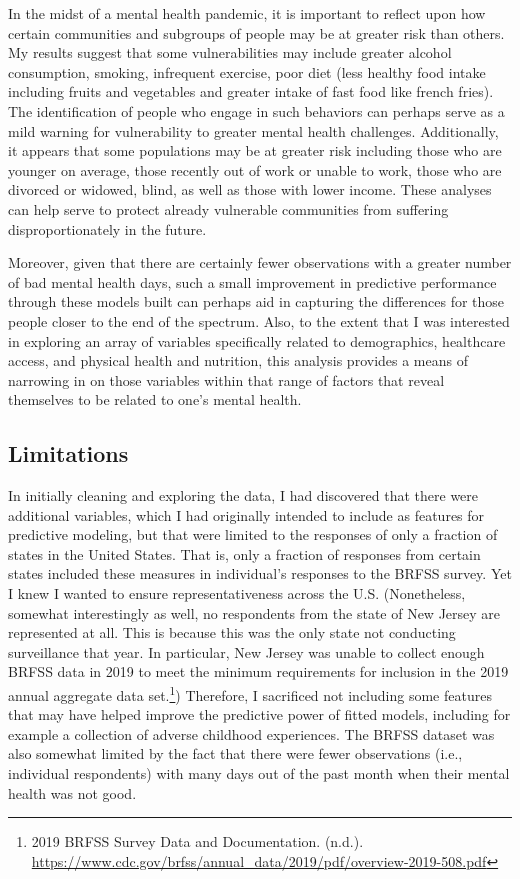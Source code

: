\documentclass[
]{article}
\begin{document}
In the midst of a mental health pandemic, it is important to reflect upon how certain communities and subgroups of people may be at greater risk than others. My results suggest that some vulnerabilities may include greater alcohol consumption, smoking, infrequent exercise, poor diet (less healthy food intake including fruits and vegetables and greater intake of fast food like french fries). The identification of people who engage in such behaviors can perhaps serve as a mild warning for vulnerability to greater mental health challenges. Additionally, it appears that some populations may be at greater risk including those who are younger on average, those recently out of work or unable to work, those who are divorced or widowed, blind, as well as those with lower income. These analyses can help serve to protect already vulnerable communities from suffering disproportionately in the future.

Moreover, given that there are certainly fewer observations with a greater number of bad mental health days, such a small improvement in predictive performance through these models built can perhaps aid in capturing the differences for those people closer to the end of the spectrum. Also, to the extent that I was interested in exploring an array of variables specifically related to demographics, healthcare access, and physical health and nutrition, this analysis provides a means of narrowing in on those variables within that range of factors that reveal themselves to be related to one's mental health.

\hypertarget{limitations}{%
\subsection{Limitations}\label{limitations}}

In initially cleaning and exploring the data, I had discovered that there were additional variables, which I had originally intended to include as features for predictive modeling, but that were limited to the responses of only a fraction of states in the United States. That is, only a fraction of responses from certain states included these measures in individual's responses to the BRFSS survey. Yet I knew I wanted to ensure representativeness across the U.S. (Nonetheless, somewhat interestingly as well, no respondents from the state of New Jersey are represented at all. This is because this was the only state not conducting surveillance that year. In particular, New Jersey was unable to collect enough BRFSS data in 2019 to meet the minimum requirements for inclusion in the 2019 annual aggregate data set.\footnote{2019 BRFSS Survey Data and Documentation. (n.d.). \url{https://www.cdc.gov/brfss/annual_data/2019/pdf/overview-2019-508.pdf}}) Therefore, I sacrificed not including some features that may have helped improve the predictive power of fitted models, including for example a collection of adverse childhood experiences. The BRFSS dataset was also somewhat limited by the fact that there were fewer observations (i.e., individual respondents) with many days out of the past month when their mental health was not good.
\end{document}
